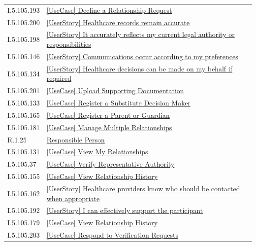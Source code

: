 \begin{longtable}{p{.22\linewidth}p{.73\linewidth}}
I.5.105.193 & \hyperref[element:56cf654d917b45a9a0728adf5549b8ba]{[UseCase] Decline a Relationship Request} \\
I.5.105.200 & \hyperref[element:5a749b7d69c34b5691115ec8a2f9abe2]{[UserStory] Healthcare records remain accurate} \\
I.5.105.198 & \hyperref[element:5ab3a2095d314d3583b1b38401660945]{[UserStory] It accurately reflects my current legal authority or responsibilities} \\
I.5.105.146 & \hyperref[element:5cb87e4a2db24b82b7ebdb71ea445ed2]{[UserStory] Communications occur according to my preferences} \\
I.5.105.134 & \hyperref[element:5febdbc53a944948b8c0f706bff61463]{[UserStory] Healthcare decisions can be made on my behalf if required} \\
I.5.105.201 & \hyperref[element:6032a95ba2a443f0b31c6b847390d908]{[UseCase] Upload Supporting Documentation} \\
I.5.105.133 & \hyperref[element:603a93646aef4e7cb33ae3254fc2c762]{[UseCase] Register a Substitute Decision Maker} \\
I.5.105.165 & \hyperref[element:6788ddc11f3b4a94b97a110c2c980ea4]{[UseCase] Register a Parent or Guardian} \\
I.5.105.181 & \hyperref[element:6d75b6267c714461a968fa0003425144]{[UseCase] Manage Multiple Relationships} \\
R.1.25 & \hyperref[element:705ed4e6d6bd4bb3a734d429943c62de]{Responsible Person} \\
I.5.105.131 & \hyperref[element:73fdd78a5d144b198e258b7462503601]{[UseCase] View My Relationships} \\
I.5.105.37 & \hyperref[element:74824354f2534bf190d9b77423d380d9]{[UseCase] Verify Representative Authority} \\
I.5.105.155 & \hyperref[element:74f5bfd7762d46cc894ebe871814874b]{[UseCase] View Relationship History} \\
I.5.105.162 & \hyperref[element:7655b27c89a74b9b97d6d1281b737a79]{[UserStory] Healthcare providers know who should be contacted when appropriate} \\
I.5.105.192 & \hyperref[element:77bb879717d0492c95522edfce5586f9]{[UserStory] I can effectively support the participant} \\
I.5.105.179 & \hyperref[element:7dffa062aed64d7292da4c5c7072b1c8]{[UseCase] View Relationship History} \\
I.5.105.203 & \hyperref[element:7f9b1deef9344c40aafa658a6f450945]{[UseCase] Respond to Verification Requests} \\

\end{longtable}
